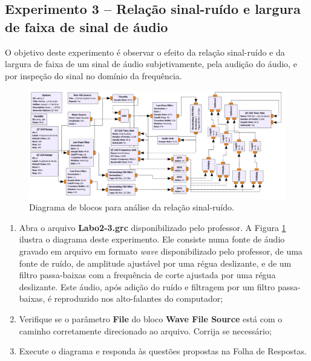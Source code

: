 \documentclass[12pt,addpoints]{exam}
\begin{document}
\subsection{Experimento 3 -- Relação sinal-ruído e largura de faixa de sinal de áudio}

O objetivo deste experimento é observar o efeito da relação sinal-ruído e da largura de faixa de um sinal de áudio subjetivamente, pela audição do áudio, e por inspeção do sinal no domínio da frequência.

\begin{figure}[htb]
    \centering
    \includegraphics[width=1.0\linewidth]{./Figuras/GRC_2-3.png}
    \caption{Diagrama de blocos para análise da relação sinal-ruído.} 
    \label{fig:GRC_2-2b}
\end{figure}

\begin{enumerate}
    \item Abra o arquivo \textbf{Labo2-3.grc} disponibilizado pelo professor. A Figura \ref{fig:GRC_2-2b} ilustra o diagrama deste experimento. Ele consiste numa fonte de áudio gravado em arquivo em formato \textit{wave} disponibilizado pelo professor, de uma fonte de ruído, de amplitude ajustável por uma régua deslizante, e de um filtro passa-baixas com a frequência de corte ajustada por uma régua deslizante. Este áudio, após adição do ruído e filtragem por um filtro passa-baixas, é reproduzido nos alto-falantes do computador;
    \item Verifique se o parâmetro \textbf{File} do bloco \textbf{Wave File Source} está com o caminho corretamente direcionado ao arquivo. Corrija se necessário;
    \item Execute o diagrama e responda às questões propostas na Folha de Respostas.
\end{enumerate}

\newpage {}
\end{document}
